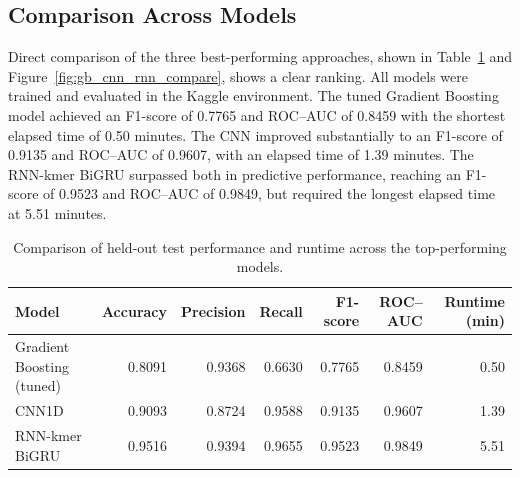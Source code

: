 

\subsection{Comparison Across Models}

Direct comparison of the three best-performing approaches, shown in Table~\ref{tab:gb_cnn_rnn_compare} and Figure~\ref{fig:gb_cnn_rnn_compare}, shows a clear ranking. All models were trained and evaluated in the Kaggle environment. The tuned Gradient Boosting model achieved an F1-score of 0.7765 and ROC--AUC of 0.8459 with the shortest elapsed time of 0.50 minutes. The CNN improved substantially to an F1-score of 0.9135 and ROC--AUC of 0.9607, with an elapsed time of 1.39 minutes. The RNN-kmer BiGRU surpassed both in predictive performance, reaching an F1-score of 0.9523 and ROC--AUC of 0.9849, but required the longest elapsed time at 5.51 minutes.

\begin{table}[H]
\centering
\small
\caption{Comparison of held-out test performance and runtime across the top-performing models.}
\label{tab:gb_cnn_rnn_compare}
\begin{tabular}{lrrrrrr}
\toprule
Model & Accuracy & Precision & Recall & F1-score & ROC--AUC & Runtime (min) \\
\midrule
Gradient Boosting (tuned) & 0.8091 & 0.9368 & 0.6630 & 0.7765 & 0.8459 & 0.50 \\
CNN1D                     & 0.9093 & 0.8724 & 0.9588 & 0.9135 & 0.9607 & 1.39 \\
RNN-kmer BiGRU            & 0.9516 & 0.9394 & 0.9655 & 0.9523 & 0.9849 & 5.51 \\
\bottomrule
\end{tabular}
\end{table}

